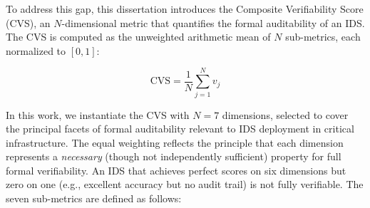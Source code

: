 \documentclass[12pt, letterpaper, oneside]{report}
\begin{document}
To address this gap, this dissertation introduces the Composite Verifiability Score (CVS), an $N$-dimensional metric that quantifies the formal auditability of an IDS. The CVS is computed as the unweighted arithmetic mean of $N$ sub-metrics, each normalized to $[0, 1]$:

\begin{equation}
\label{eq:cvs}
\text{CVS} = \frac{1}{N} \sum_{j=1}^{N} v_j
\end{equation}

\noindent In this work, we instantiate the CVS with $N = 7$ dimensions, selected to cover the principal facets of formal auditability relevant to IDS deployment in critical infrastructure. The equal weighting reflects the principle that each dimension represents a \emph{necessary} (though not independently sufficient) property for full formal verifiability. An IDS that achieves perfect scores on six dimensions but zero on one (e.g., excellent accuracy but no audit trail) is not fully verifiable. The seven sub-metrics are defined as follows:
\end{document}
